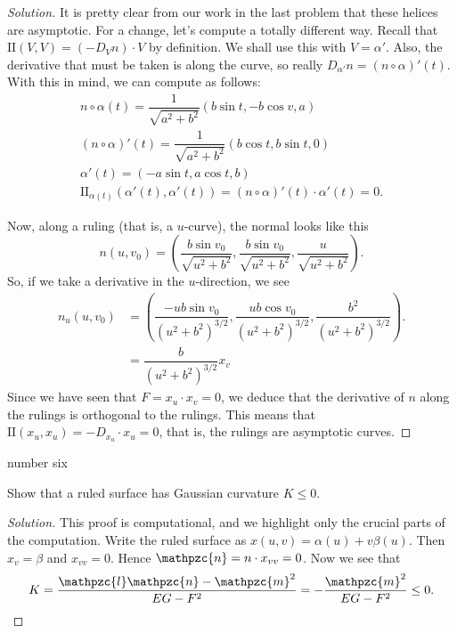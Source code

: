 \documentclass[Shifrin_Solutions_Spring_2015]{subfiles}
\begin{document}
\begin{proof}[Solution]
It is pretty clear from our work in the last problem that these helices are asymptotic. For a change, let's compute a totally different way. Recall that $\mathrm{II}(V,V) = \left( -D_{V}n\right) \cdot V$ by definition. We shall use this with $V = \alpha'$. Also, the derivative that must be taken is along the curve, so really $D_{\alpha'}n = (n\circ \alpha)'(t)$. With this in mind, we can compute as follows:
\begin{align*}
n\circ \alpha(t) = \dfrac{1}{\sqrt{a^2+b^2}} \left( b \sin t , -b \cos v , a \right) \\
(n\circ \alpha)'(t) = \dfrac{1}{\sqrt{a^2+b^2}}\left( b\cos t , b \sin t , 0 \right)\\
\alpha'(t) = \left( -a\sin t , a\cos t , b\right) \\
\mathrm{II}_{\alpha(t)}(\alpha'(t), \alpha'(t) ) = (n\circ\alpha)'(t) \cdot \alpha'(t) = 0.
\end{align*}

Now, along a ruling (that is, a $u$-curve), the normal looks like this
\[
n(u,v_0) = \left( \dfrac{b\sin v_0}{\sqrt{u^2 + b^2}} , \dfrac{b\sin v_0}{\sqrt{u^2 + b^2}} , \dfrac{u}{\sqrt{u^2 + b^2}}\right).
\]
So, if we take a derivative in the $u$-direction, we see
\[
\begin{split}
n_u (u,v_0) & = \left( \dfrac{-ub\sin v_0}{(u^2+b^2)^{3/2}}, \dfrac{ub\cos v_0}{(u^2+b^2)^{3/2}} , \dfrac{b^2}{(u^2+b^2)^{3/2}}\right) . \\
	& = \dfrac{b}{(u^2+b^2)^{3/2}} x_v
\end{split}
\]
Since we have seen that $F = x_u\cdot x_v = 0$, we deduce that the derivative of $n$ along the rulings is orthogonal to the rulings. This means that $\mathrm{II}(x_u,x_u) = -D_{x_u} \cdot x_u =0$, that is, the rulings are asymptotic curves.
\end{proof}

\begin{exercise}
number six
\end{exercise}

\begin{exercise}
Show that a ruled surface has Gaussian curvature $K\leq 0$.
\end{exercise}

\begin{proof}[Solution]
This proof is computational, and we highlight only the crucial parts of the computation. Write the ruled surface as $x(u,v) = \alpha(u)+ v\beta(u)$. Then $x_v = \beta$ and $x_{vv} = 0$. Hence $\mathpzc{n} = n\cdot x_{vv} = 0$. Now we see that
\[
K = \dfrac{\mathpzc{l}\mathpzc{n}- \mathpzc{m}^2}{EG-F^2} = - \dfrac{ \mathpzc{m}^2}{EG-F^2} \leq 0 .
\]
\end{proof}
\end{document}
